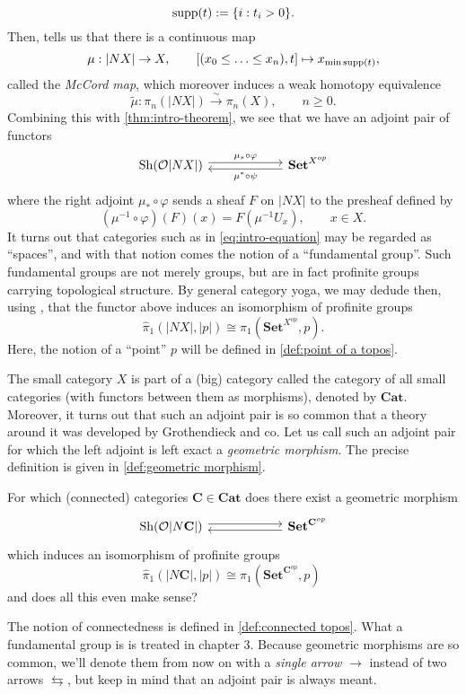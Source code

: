 \[ \operatorname{supp}(t) := \{i : t_i > 0\}. \]
Then, \cite[Theorem 1.4.6]{barmak11} tells us that there is a continuous map
\[ \mu : |NX| \to X, \qquad [(x_0 \leq \ldots \leq x_n),t] \mapsto x_{\min \operatorname{supp}(t)}, \]
called the \emph{McCord map}, which moreover induces a weak homotopy equivalence
\[ \widetilde{\mu} : \pi_n(|NX|) \xrightarrow{\sim} \pi_n(X), \qquad n \geq 0. \]
Combining this with \cref{thm:intro-theorem}, we see that we have an adjoint pair of functors
\begin{equation}
\label{eq:intro-equation}
\begin{tikzcd}
\Sh(\mathcal{O}|NX|) \arrow[shift left=0.25em]{rr}{\mu_* \circ \varphi} & \; & \mathbf{Set}^{X^{op}} \arrow[shift left=0.25em]{ll}{\mu^* \circ \psi} \end{tikzcd}
\end{equation}
where the right adjoint $\mu_* \circ \varphi$ sends a sheaf $F$ on $|NX|$ to the presheaf defined by
\[ \left(\mu^{-1} \circ \varphi\right)(F)(x) = F\left( \mu^{-1} U_x \right), \qquad x \in X. \]
It turns out that categories such as in \cref{eq:intro-equation} may be regarded as ``spaces'', and with that notion comes the notion of a ``fundamental group''. Such fundamental groups are not merely groups, but are in fact profinite groups carrying topological structure. By general category yoga, we may dedude then, using \cite[Theorem 1.15]{lenstra08}, that the functor above induces an isomorphism of profinite groups
\[ \widehat{\pi}_1\left(|NX|, |p| \right) \cong \pi_1\left( \mathbf{Set}^{X^{op}}, p \right). \]
Here, the notion of a ``point'' $p$ will be defined in \cref{def:point of a topos}.

The small category $X$ is part of a (big) category called the category of all small categories (with functors between them as morphisms), denoted by $\mathbf{Cat}$. Moreover, it turns out that such an adjoint pair is so common that a theory around it was developed by Grothendieck and co. Let us call such an adjoint pair for which the left adjoint is left exact a \emph{geometric morphism}. The precise definition is given in \cref{def:geometric morphism}.

\begin{question}
\label{eq:intro-question}
For which (connected) categories $\mathbf{C} \in \mathbf{Cat}$ does there exist a geometric morphism
\[
\begin{tikzcd}
\Sh(\mathcal{O}|N\mathbf{C}|) \arrow[shift left=0.25em]{rr} & \; & \mathbf{Set}^{\mathbf{C}^{op}} \arrow[shift left=0.25em]{ll} \end{tikzcd}
\]
which induces an isomorphism of profinite groups
\[ \widehat{\pi}_1(|N\mathbf{C}|, |p|) \cong \pi_1\left(\mathbf{Set}^{\mathbf{C}^{op}}, p \right)\; \]
and does all this even make sense?
\end{question}
The notion of connectedness is defined in \cref{def:connected topos}. What a fundamental group is is treated in chapter 3. Because geometric morphisms are so common, we'll denote them from now on with a \emph{single arrow} $\to$ instead of two arrows $\leftrightarrows$, but keep in mind that an adjoint pair is always meant.

